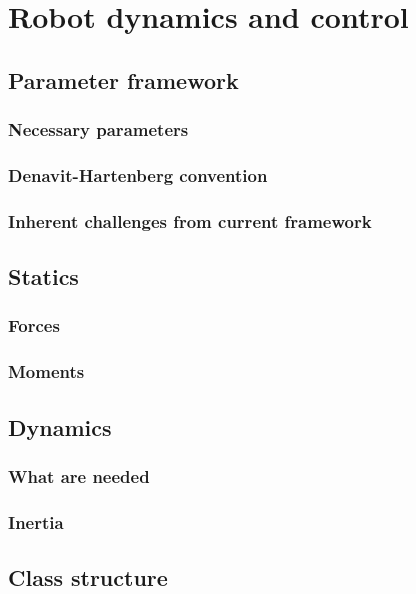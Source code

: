 \chapter{Robot dynamics and control}

\section{Parameter framework}
\lipsum[1]
\subsection{Necessary parameters}
\subsection{Denavit-Hartenberg convention}
\subsection{Inherent challenges from current framework}

\section{Statics}
\lipsum[1]
\subsection{Forces}
\subsection{Moments}

\section{Dynamics}
\lipsum[1]
\subsection{What are needed}
\subsection{Inertia}

\section{Class structure}
\lipsum[1]